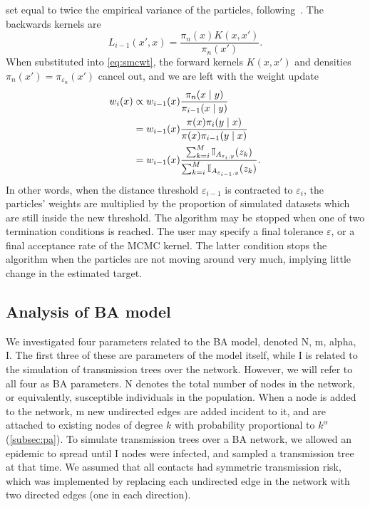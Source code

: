 set equal to twice the empirical variance of the particles,
following~\autocite{beaumont2009adaptive, del2012adaptive}. The backwards
kernels are
\[
  L_{i-1}(x', x) = \frac{\pi_n(x)K(x, x')}{\pi_n(x')}.
\]
When substituted into \cref{eq:smcwt}, the forward kernels $K(x, x')$ and
densities $\pi_n(x') = \pi_{\varepsilon_n}(x')$ cancel out, and we are left
with the weight update 
\begin{align*}
  w_i(x) 
    &\propto w_{i-1}(x) \frac{\pi_n(x \mid y)}{\pi_{i-1}(x \mid y)} \\
    &= w_{i-1}(x) \frac{\pi(x) \pi_i(y \mid x)}{\pi(x) \pi_{i-1}(y \mid x)} \\
    &= w_{i-1}(x) \frac{\sum_{k=i}^M \mathbb{I}_{A_{\varepsilon_i, y}}(z_k)}
            {\sum_{k=i}^M \mathbb{I}_{A_{\varepsilon_{i-1}, y}}(z_k)}.
\end{align*}
In other words, when the distance threshold $\varepsilon_{i-1}$ is contracted
to $\varepsilon_i$, the particles' weights are multiplied by the proportion of
simulated datasets which are still inside the new threshold. The algorithm may
be stopped when one of two termination conditions is reached. The user may
specify a final tolerance $\varepsilon$, or a final acceptance rate of the
\gls{MCMC} kernel. The latter condition stops the algorithm when the particles
are not moving around very much, implying little change in the estimated
target.

\subsection{Analysis of \acrlong{BA} model}

We investigated four parameters related to the \gls{BA} model, denoted
\gls{N}, \gls{m}, \gls{alpha}, \gls{I}. The first three of these are parameters
of the model itself, while \gls{I} is related to the simulation of transmission
trees over the network. However, we will refer to all four as \gls{BA}
parameters. \gls{N} denotes the total number of nodes in the network, or
equivalently, susceptible individuals in the population. When a node is added
to the network, \gls{m} new undirected edges are added incident to it, and are
attached to existing nodes of degree $k$ with probability proportional to
$k^\alpha$ (\cref{subsec:pa}). To simulate transmission trees over a
\gls{BA} network, we allowed an epidemic to spread until \gls{I} nodes were
infected, and sampled a transmission tree at that time. We assumed that all
contacts had symmetric transmission risk, which was implemented by replacing
each undirected edge in the network with two directed edges (one in each
direction).

